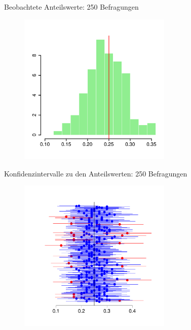 \documentclass[usenames,dvipsnames,handout]{beamer}
\begin{document}
\begin{frame}{Beobachtete Anteilswerte: 250 Befragungen}
  \begin{figure}[ht]
 	\centering
 	      \includegraphics[width=0.65\textwidth]{prob_est250.pdf}%
 	\end{figure}
\end{frame}

\begin{frame}{Konfidenzintervalle zu den Anteilswerten: 250 Befragungen}
  \begin{figure}[ht]
 	\centering
 	      \includegraphics[width=0.65\textwidth]{confi250.pdf}%
 	\end{figure}
\end{frame}
\end{document}
